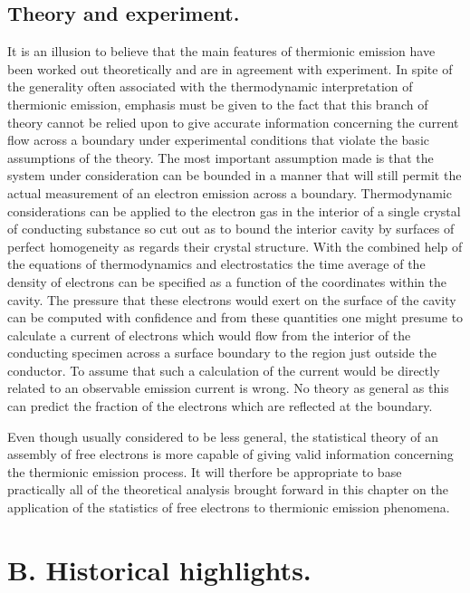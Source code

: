 \documentclass[11pt,a4paper]{article}
\begin{document}
	\subsection{Theory and experiment.}
	
	It is an illusion to believe that the main features
	of thermionic emission have been worked out theoretically and are in agreement
	with experiment.  In spite of the generality often associated with the thermodynamic interpretation of thermionic emission, emphasis must be given to the
	fact that this branch of theory cannot be relied upon to give accurate information
	concerning the current flow across a boundary under experimental conditions
	that violate the basic assumptions of the theory. The most important assumption
	made is that the system under consideration can be bounded in a manner
	that will still permit the actual measurement of an electron emission across a
	boundary. Thermodynamic considerations can be applied to the electron gas
	in the interior of a single crystal of conducting substance so cut out as to bound
	the interior cavity by surfaces of perfect homogeneity as regards their crystal
	structure. With the combined help of the equations of thermodynamics and
	electrostatics the time average of the density of electrons can be specified as a
	function of the coordinates within the cavity. The pressure that these electrons
	would exert on the surface of the cavity can be computed with confidence and
	from these quantities one might presume to calculate a current of electrons which
	would flow from the interior of the conducting specimen across a surface boundary to the region just outside the conductor. To assume that such a calculation
	of the current would be directly related to an observable emission current is
	wrong. No theory as general as this can predict the fraction of the electrons
	which are reflected at the boundary.
	
	Even though usually considered to be less general, the statistical theory of
	an assembly of free electrons is more capable of giving valid information concerning the thermionic emission process. It will therfore be appropriate to base
	practically all of the theoretical analysis brought forward in this chapter on the
	application of the statistics of free electrons to thermionic emission phenomena.
	
	
	\section{B. Historical highlights.}
	
\end{document}
